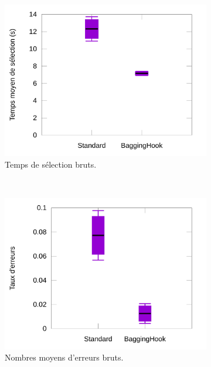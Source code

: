 	\begin{figure}[htbp]
		\begin{subfigure}[t]{0.49\textwidth}
			\centering
			\includegraphics[width=\textwidth]{figures/ch5/baggingRawTimes}
			\caption{Temps de sélection bruts.}
			\label{fig:baggingRawTimes}
		\end{subfigure}
		~
		\begin{subfigure}[t]{0.49\textwidth}
			\centering
			\includegraphics[width=\textwidth]{figures/ch5/baggingRawErrors}
			\caption{Nombres moyens d'erreurs bruts.}
			\label{fig:baggingRawErrors}
		\end{subfigure}
		~
		\begin{subfigure}[t]{0.49\textwidth}
			\centering

\end{subfigure}
\end{figure}
